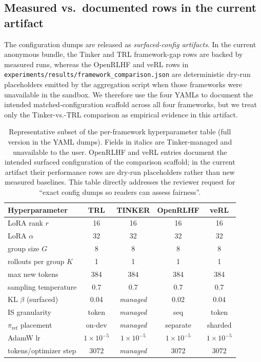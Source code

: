 \subsection{Measured vs.\ documented rows in the current artifact}

The configuration dumps are released as \emph{surfaced-config artifacts}.
In the current anonymous bundle, the Tinker and TRL framework-gap rows are
backed by measured runs, whereas the OpenRLHF and veRL rows in
\texttt{experiments/results/framework\_comparison.json} are deterministic
dry-run placeholders emitted by the aggregation script when those
frameworks were unavailable in the sandbox. We therefore use the four YAMLs
to document the intended matched-configuration scaffold across all four
frameworks, but we treat only the Tinker-vs.-TRL comparison as empirical
evidence in this artifact.

\begin{table}[ht]
\centering
\small
\begin{tabular}{lcccc}
\toprule
Hyperparameter & TRL & TINKER & OpenRLHF & veRL \\
\midrule
LoRA rank $r$                  & 16   & 16   & 16   & 16   \\
LoRA $\alpha$                  & 32   & 32   & 32   & 32   \\
group size $G$                 & 8    & 8    & 8    & 8    \\
rollouts per group $K$         & 1    & 1    & 1    & 1    \\
max new tokens                 & 384  & 384  & 384  & 384  \\
sampling temperature           & 0.7  & 0.7  & 0.7  & 0.7  \\
KL $\beta$ (surfaced)          & 0.04 & \emph{managed} & 0.02 & 0.04 \\
IS granularity                 & token & \emph{managed} & seq  & token \\
$\pi_\text{ref}$ placement      & on-dev & \emph{managed} & separate & sharded \\
AdamW lr                       & $1\!\times\!10^{-5}$ & $1\!\times\!10^{-5}$ & $1\!\times\!10^{-5}$ & $1\!\times\!10^{-5}$ \\
tokens/optimizer step          & 3072 & \emph{managed} & 3072 & 3072 \\
\bottomrule
\end{tabular}
\caption{Representative subset of the per-framework hyperparameter table
(full version in the YAML dumps). Fields in italics are Tinker-managed
and unavailable to the user. OpenRLHF and veRL entries document the
intended surfaced configuration of the comparison scaffold; in the current
artifact their performance rows are dry-run placeholders rather than new
measured baselines. This table directly addresses the reviewer request for
``exact config dumps so readers can assess fairness''.}
\label{tab:framework-configs}
\end{table}

